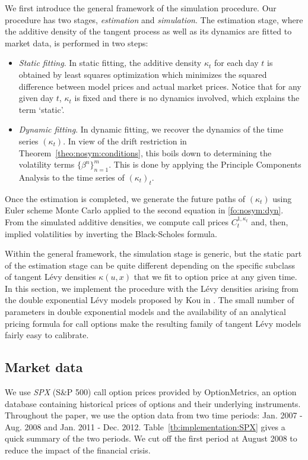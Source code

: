 \documentclass{article}
\numberwithin{equation}{section}
\begin{document}
We first introduce the general framework of the simulation procedure. Our procedure has two stages, \emph{estimation} and \emph{simulation}. The estimation stage, where the additive density of the tangent process as well as its dynamics are fitted to market data, is performed in two steps: 
\begin{itemize}
\item \emph{Static fitting}. In static fitting, the additive density $\kappa_t$ for each day $t$ is obtained by least squares optimization which minimizes the squared difference between model prices and actual market prices. Notice that for any given day $t$, $\kappa_t$ is fixed and there is no dynamics involved, which explains the term `static'.

\item \emph{Dynamic fitting}. In dynamic fitting, we recover the dynamics of the time series $(\kappa_t)$. In view of the drift restriction in Theorem~\ref{theo:nosym:conditions}, this boils down to determining the volatility terms $\{\beta^n\}_{n = 1}^m$. This is done by applying the Principle Components Analysis to the time series of $(\kappa_t)_t$.
\end{itemize}
Once the estimation is completed, we generate the future paths of $(\kappa_t)$ using Euler scheme Monte Carlo applied to the second equation in \eqref{fo:nosym:dyn}. From the simulated additive densities, we compute call prices $C_t^{1,\kappa_t}$ and, then, implied volatilities by inverting the Black-Scholes formula. 

Within the general framework, the simulation stage is generic, but the static part of the estimation stage can be quite different depending on the specific subclass of tangent L\'{e}vy densities $\kappa(u,x)$ that we fit to option price at any given time. In this section, we implement the procedure with the L\'evy densities arising from the double exponential L\'{e}vy models proposed by Kou in \cite{Kou2002model}. The small number of parameters in double exponential models and the availability of an analytical pricing formula for call options make the resulting family of tangent L\'{e}vy models fairly easy to calibrate. 




\subsection{Market data} \label{sec:implementation:data}

We use \emph{SPX} (S\&P 500) call option prices provided by OptionMetrics, an option database containing historical prices of options and their underlying instruments. Throughout the paper, we use the option data from two time periods: Jan. 2007 - Aug. 2008 and Jan. 2011 - Dec. 2012. Table~\ref{tb:implementation:SPX} gives a quick summary of the two periods.  We cut off the first period at August 2008 to reduce the impact of the financial crisis. 
\end{document}
